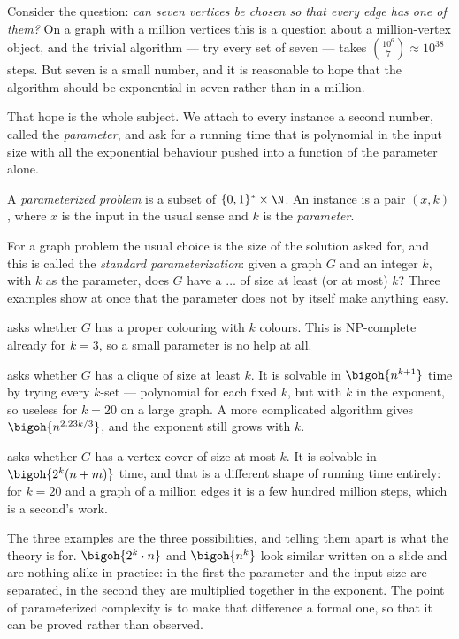 Consider the question: \emph{can seven vertices be chosen so that every edge has
one of them?} On a graph with a million vertices this is a question about a
million-vertex object, and the trivial algorithm --- try every set of seven ---
takes $\binom{10^6}{7} \approx 10^{38}$ steps. But seven is a small number, and
it is reasonable to hope that the algorithm should be exponential in seven
rather than in a million.

That hope is the whole subject. We attach to every instance a second number,
called the \emph{parameter}, and ask for a running time that is polynomial in
the input size with all the exponential behaviour pushed into a function of the
parameter alone.

\begin{definition}\label{def:fpt-problem}
A \emph{parameterized problem} is a subset of $\{0,1\}^{*} \times \N$. An
instance is a pair $(x,k)$, where $x$ is the input in the usual sense and $k$ is
the \emph{parameter}.
\end{definition}

For a graph problem the usual choice is the size of the solution asked for, and
this is called the \emph{standard parameterization}: given a graph $G$ and an
integer $k$, with $k$ as the parameter, does $G$ have a $\ldots$ of size at
least (or at most) $k$? Three examples show at once that the parameter does not
by itself make anything easy.

\begin{example}\label{ex:fpt-three}
 asks whether $G$ has a proper colouring with $k$ colours.
This is \textrm{NP}-complete already for $k = 3$, so a small parameter is no
help at all.

 asks whether $G$ has a clique of size at least $k$. It is solvable
in $\bigoh{n^{k+1}}$ time by trying every $k$-set --- polynomial for each fixed
$k$, but with $k$ in the exponent, so useless for $k = 20$ on a large graph.
A more complicated algorithm gives $\bigoh{n^{2.23k/3}}$, and the exponent still
grows with $k$.

 asks whether $G$ has a vertex cover of size at most $k$. It
is solvable in $\bigoh{2^k(n+m)}$ time, and that is a different shape of running
time entirely: for $k = 20$ and a graph of a million edges it is a few hundred
million steps, which is a second's work.
\end{example}

\begin{intuition}
The three examples are the three possibilities, and telling them apart is what
the theory is for. $\bigoh{2^k \cdot n}$ and $\bigoh{n^k}$ look similar written
on a slide and are nothing alike in practice: in the first the parameter and the
input size are separated, in the second they are multiplied together in the
exponent. The point of parameterized complexity is to make that difference a
formal one, so that it can be proved rather than observed.
\end{intuition}

